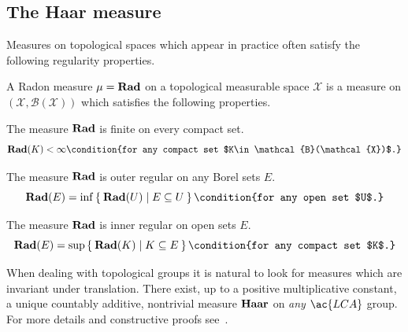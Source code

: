 \subsection{The Haar measure}
Measures on topological spaces which appear in practice often satisfy the
following regularity properties.
\begin{definition}
    A Radon measure $\mu=\mathbf{Rad}$ on a topological measurable space
    $\mathcal{X}$ is a measure on $(\mathcal{X}, \mathcal{B}(\mathcal{X}))$
    which satisfies the following properties.
    \begin{propenum}
        \item The measure $\mathbf{Rad}$ is finite on every compact set.
        \begin{dmath*}
            \Radon(K) < \infty\condition{for any compact set
            $K\in\mathcal{B}(\mathcal{X})$.}
        \end{dmath*}
        \item The measure $\mathbf{Rad}$ is outer regular on any Borel sets $E$.
        \begin{dmath*}
            \Radon(E)=\inf \Set{\Radon(U) | E\subseteq U}\condition{for any
            open set $U$.}
        \end{dmath*}
        \item The measure $\mathbf{Rad}$ is inner regular on open sets $E$.
        \begin{dmath*}
            \Radon(E)=\sup\Set{\Radon(K) | K\subseteq E}\condition{for any
            compact set $K$.}
        \end{dmath*}
    \end{propenum}
\end{definition}
When dealing with topological groups it is natural to look for measures which
are invariant under translation. There exist, up to a positive multiplicative
constant, a unique countably additive, nontrivial measure $\mathbf{Haar}$ on \emph{any}
$\ac{LCA}$ group. For more details and constructive proofs
see~\citet{alfsen1964simplified,folland1994course,conway2013course}.

